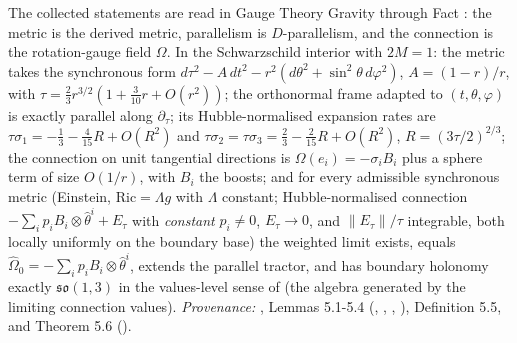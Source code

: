 The collected statements are read in Gauge Theory Gravity through Fact : the metric is the derived metric, parallelism is $D$-parallelism, and the connection is the rotation-gauge field $\Omega$. In the Schwarzschild interior with $2M = 1$: the metric takes the synchronous form $d\tau^2 - A\,dt^2 - r^2(d\theta^{2} + \sin^{2}\theta\,d\varphi^{2})$, $A = (1-r)/r$, with $\tau = \tfrac23 r^{3/2}(1 + \tfrac{3}{10}r + O(r^2))$; the orthonormal frame adapted to $(t, \theta, \varphi)$ is exactly parallel along $\partial_\tau$; its Hubble-normalised expansion rates are $\tau\sigma_1 = -\tfrac13 - \tfrac{4}{15}R + O(R^2)$ and $\tau\sigma_2 = \tau\sigma_3 = \tfrac23 - \tfrac{2}{15}R + O(R^2)$, $R = (3\tau/2)^{2/3}$; the connection on unit tangential directions is $\Omega(e_i) = -\sigma_i B_i$ plus a sphere term of size $O(1/r)$, with $B_i$ the boosts; and for every admissible synchronous metric (Einstein, $\mathrm{Ric} = \Lambda g$ with $\Lambda$ constant; Hubble-normalised connection $-\sum_i p_iB_i \otimes \hat\theta^i + E_\tau$ with \emph{constant} $p_i \neq 0$, $E_\tau \to 0$, and $\|E_\tau\|/\tau$ integrable, both locally uniformly on the boundary base) the weighted limit exists, equals $\widehat\Omega_0 = -\sum_i p_i B_i \otimes \hat\theta^i$, extends the parallel tractor, and has boundary holonomy exactly $\mathfrak{so}(1,3)$ in the values-level sense of \cite[Def.~5.5]{ButlerT6} (the algebra generated by the limiting connection values). \emph{Provenance:} \cite{ButlerT6}, Lemmas 5.1-5.4 (, , , ), Definition 5.5, and Theorem 5.6 ().
